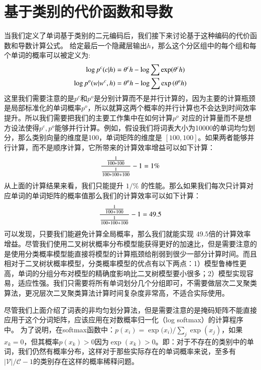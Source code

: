 \section{基于类别的代价函数和导数}
当我们定义了单词基于类别的二元编码后，我们接下来讨论基于这种编码的代价函数和导数计算公式。
给定最后一个隐藏层输出$ h $，那么这个分区组中的每个组和每个单词的概率可以被定义为:
\begin{equation}
\setlength{\abovedisplayskip}{6pt}
\setlength{\belowdisplayskip}{6pt}
\begin{split}
\log p^c(c|h) &= \theta^c h-\log \sum{\exp( \theta^c h )} \\
\log p^o(w|w^c,h)&=\theta^o h -\log\sum\exp{(\theta^o h)}
\end{split}
\end{equation}
这里我们需要注意的是$ p ^ c $和$ p ^o $是分别计算而不是并行计算的，因为主要的计算瓶颈是局部标准化的单词概率$ p ^ o $，所以就算这两个概率的并行计算也不会达到时间效率提升。所以我们需要把我们的主要工作集中在如何计算$p^o$ 对应的计算量而不是想方设法使得$p^c,p^o$能够并行计算。例如，假设我们将词表大小为10000的单词均匀划分，那么类别向量的维度是100，单词矩阵的维度是 $[100,100]$。如果两者能够并行计算，而不是顺序计算，它所带来的计算效率增益可以如下计算：
\begin{equation}\label{equ:example}
\setlength{\abovedisplayskip}{6pt}
\setlength{\belowdisplayskip}{6pt}
  \frac{\frac{1}{100*100}}{\frac{1}{100*100+100}}-1=1\%
\end{equation}
从上面的计算结果来看，我们只能提升 $1/\%$ 的性能。那么如果我们每次只计算对应单词的单词矩阵的概率值那么我们的计算效率可以如下计算：
\begin{equation}\label{equ:example2}
\setlength{\abovedisplayskip}{6pt}
\setlength{\belowdisplayskip}{6pt}
  \frac{\frac{1}{100+100}}{\frac{1}{100*100+100}}-1=49.5
\end{equation}
可以发现，只要我们能避免计算全局概率，那么我们就能实现 $49.5$倍的计算效率增益。尽管我们使用二叉树状概率分布模型能获得更好的加速比，但是需要注意的是使用分类概率模型能直接将模型的计算瓶颈给削弱到很少一部分计算时间。而且相对于二叉树状概率模型，分类概率模型的优点有以下两点：1）模型鲁棒性更高，单词的分组分布对模型的精确度影响比二叉树模型要小很多；2）模型实现容易，适应性强。我们只需要将所有单词划分几个分组即可，不需要做层次二叉聚类算法，更况层次二叉聚类算法计算时间复杂度非常高，不适合实际使用。



尽管我们上面介绍了词表的非均匀划分算法，但是需要注意的是掩码矩阵不能直接应用于这个分词矩阵，应该应用在对数概率归一化（log softmax）的计算程序中。 为了说明，在softmax函数中：$ p(x_i)= {\exp({x_i}})/ {\sum_j \exp(x_j)} $，如果$ x_k = 0 $，但其概率$ p(x_k)> 0$因为$\exp(x_k)> 0 $。即：对于不存在的类别中的单词，我们仍然有概率分布，这样对于那些实际存在的单词概率来说，至多有$\mathcal{|V|/\mathcal{C}}-1$的类别存在这样的概率稀释问题。

